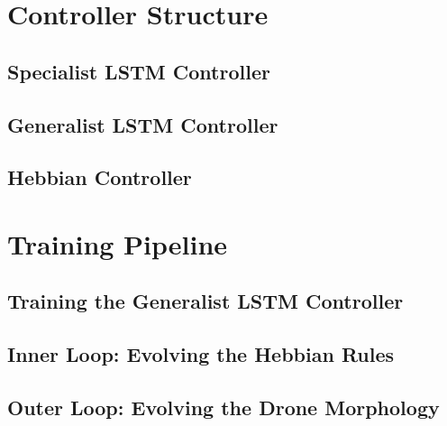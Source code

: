 \section{Controller Structure}
\subsection{Specialist LSTM Controller}
\subsection{Generalist LSTM Controller}
\subsection{Hebbian Controller}

\section{Training Pipeline}
\subsection{Training the Generalist LSTM Controller}
\subsection{Inner Loop: Evolving the Hebbian Rules}
\subsection{Outer Loop: Evolving the Drone Morphology} 